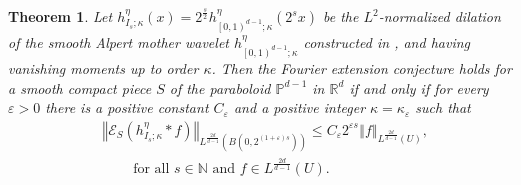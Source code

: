 \documentclass{amsart}%
\newtheorem{theorem}{Theorem}
\theoremstyle{plain}
\numberwithin{equation}{section}
\begin{document}
\begin{theorem}
\label{Thm LSST''}Let $h_{I_{s};\kappa}^{\eta}\left(  x\right)  =2^{\frac
{s}{2}}h_{\left[  0,1\right)  ^{d-1};\kappa}^{\eta}\left(  2^{s}x\right)  $ be
the $L^{2}$-normalized dilation of the smooth Alpert mother wavelet
$h_{\left[  0,1\right)  ^{d-1};\kappa}^{\eta}$ constructed in \cite{Saw7}, and
having vanishing moments up to order $\kappa$. Then the Fourier extension
conjecture holds for a smooth compact piece $S$ of the paraboloid
$\mathbb{P}^{d-1}$ in $\mathbb{R}^{d}$ \emph{if and only if} for every
$\varepsilon>0$ there is a positive constant $C_{\varepsilon}$ and a positive
integer $\kappa=\kappa_{\varepsilon}$ such that%
\begin{align*}
& \left\Vert \mathcal{E}_{S}\left(  h_{I_{s};\kappa}^{\eta}\ast f\right)
\right\Vert _{L^{\frac{2d}{d-1}}\left(  B\left(  0,2^{\left(  1+\varepsilon
\right)  s}\right)  \right)  }\leq C_{\varepsilon}2^{\varepsilon s}\left\Vert
f\right\Vert _{L^{\frac{2d}{d-1}}\left(  U\right)  },\\
& \ \ \ \ \ \ \ \ \ \ \text{for all }s\in\mathbb{N}\text{ and }f\in
L^{\frac{2d}{d-1}}\left(  U\right)  .
\end{align*}

\end{theorem}
\end{document}
